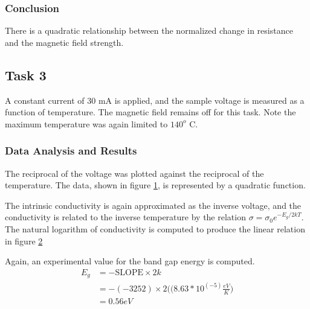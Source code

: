 \documentclass[a4paper]{article}
\begin{document}
\subsubsection{Conclusion}
\qq There is a quadratic relationship between the normalized change in
resistance and the magnetic field strength.

\subsection{Task 3}
\qq A constant current of 30 mA is applied, and the sample voltage is
 measured as a function of temperature. The magnetic field remains off
 for this task. Note the maximum temperature was again limited to
 $140^o$ C.

\subsubsection{Data Analysis and Results}
\qq The reciprocal of the voltage was plotted against the reciprocal
of the temperature. The data, shown in figure \ref{task33plot}, is
represented by a quadratic function.

\begin{figure}[H]
\centering
\label{task33plot}
\end{figure}

\qq The intrinsic conductivity is again approximated as the inverse
voltage, and the conductivity is related to the inverse temperature by
the relation $\sigma = \sigma_0 e^{-E_g/2kT}$. The natural logarithm
of conductivity is computed to produce the linear relation in figure
\ref{task33plotLINEAR}

\begin{figure}[H]
\centering
\label{task33plotLINEAR}
\end{figure}

Again, an experimental value for the band gap energy is computed.
\begin{align*}
E_g &= - \text{SLOPE} \times 2k \\
    &= - (-3252) \times 2 
       \Big( (8.63 *10^(-5) \frac{eV}{K} \Big) \\
    &= 0.56 eV \\
\end{align*}
\end{document}
